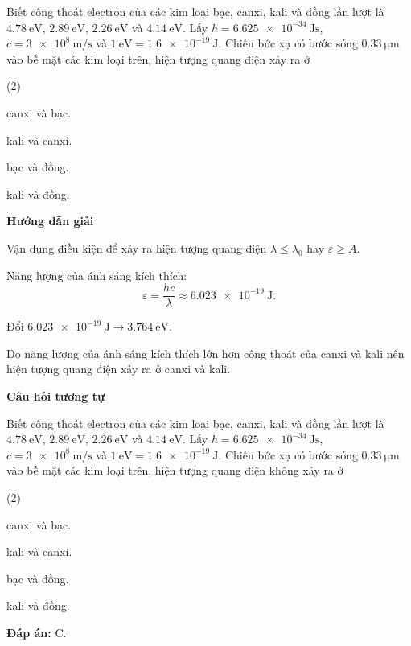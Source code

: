 {Biết công thoát electron của các kim loại bạc, canxi, kali và đồng lần lượt là $\SI{4.78}{\electronvolt}$, $\SI{2.89}{\electronvolt}$, $\SI{2.26}{\electronvolt}$ và $\SI{4.14}{\electronvolt}$. Lấy $h=\SI{6.625e-34}{\joule \second}$, $c=\SI{3e8}{\meter / \second}$ và $\SI{1}{\electronvolt}=\SI{1.6e-19}{\joule}$. Chiếu bức xạ có bước sóng $\SI{0.33}{\micro \meter}$ vào bề mặt các kim loại trên, hiện tượng quang điện xảy ra ở
	\begin{mcq}(2)
		\item canxi và bạc.
		\item kali và canxi.
		\item bạc và đồng.
		\item kali và đồng.
	\end{mcq}
}{\begin{center}
		\textbf{Hướng dẫn giải}
	\end{center}
	
	Vận dụng điều kiện để xảy ra hiện tượng quang điện $\lambda \leq \lambda_0$ hay $\varepsilon \geq A$.
	
	Năng lượng của ánh sáng kích thích:
	\begin{equation*}
		\varepsilon = \dfrac{hc}{\lambda} \approx \SI{6.023e-19}{\joule}.
	\end{equation*}
	
	Đổi $\SI{6.023e-19}{\joule} \rightarrow \SI{3.764}{\electronvolt}$.
	
	Do năng lượng của ánh sáng kích thích lớn hơn công thoát của canxi và kali nên hiện tượng quang điện xảy ra ở canxi và kali.
	
	\begin{center}
		\textbf{Câu hỏi tương tự}
	\end{center}
	
	Biết công thoát electron của các kim loại bạc, canxi, kali và đồng lần lượt là $\SI{4.78}{\electronvolt}$, $\SI{2.89}{\electronvolt}$, $\SI{2.26}{\electronvolt}$ và $\SI{4.14}{\electronvolt}$. Lấy $h=\SI{6.625e-34}{\joule \second}$, $c=\SI{3e8}{\meter / \second}$ và $\SI{1}{\electronvolt}=\SI{1.6e-19}{\joule}$. Chiếu bức xạ có bước sóng $\SI{0.33}{\micro \meter}$ vào bề mặt các kim loại trên, hiện tượng quang điện không xảy ra ở
	\begin{mcq}(2)
		\item canxi và bạc.
		\item kali và canxi.
		\item bạc và đồng.
		\item kali và đồng.
	\end{mcq}
	
	\textbf{Đáp án:} C.}
